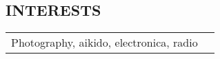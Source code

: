 \documentclass[margin, line]{res}
\begin{document}
\begin{resume}
\section{INTERESTS}
	\begin{tabular} {p{6in} r}
	Photography, aikido, electronica, radio
 	\end{tabular}
\end{resume} 
\end{document}
